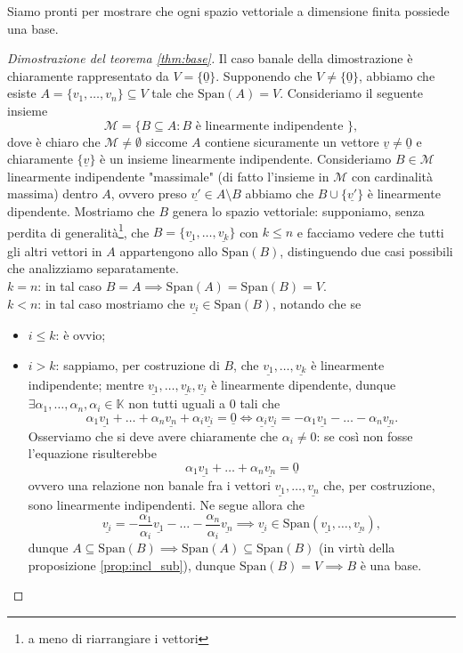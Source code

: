 Siamo pronti per mostrare che ogni spazio vettoriale a dimensione finita possiede una base.
\begin{proof}[Dimostrazione del teorema \ref{thm:base}]
    Il caso banale della dimostrazione è chiaramente rappresentato da $V = \{ \underline{0} \}$. Supponendo che $V \neq \{ \underline{0} \}$, abbiamo che esiste $A = \{ v_1, \ldots, v_n \} \subseteq V$ tale che $\text{Span}(A) = V$. Consideriamo il seguente insieme
    $$
        \mathcal{M} = \{ B \subseteq A : B \text{ è linearmente indipendente }\},
    $$
    dove è chiaro che $\mathcal{M} \neq \emptyset$ siccome $A$ contiene sicuramente un vettore $\underline{v} \neq \underline{0}$ e chiaramente $\{ \underline{v} \}$ è un insieme linearmente indipendente. Consideriamo $B \in \mathcal{M}$ linearmente indipendente "massimale" (di fatto l'insieme in $\mathcal{M}$ con cardinalità massima) dentro $A$, ovvero preso $\underline{v'} \in A \setminus B$ abbiamo che $B \cup \{ \underline{v'} \}$ è linearmente dipendente. Mostriamo che $B$ genera lo spazio vettoriale: supponiamo, senza perdita di generalità\footnote{a meno di riarrangiare i vettori}, che $B = \{ \underline{v_1}, \ldots, \underline{v_k} \}$ con $k \leq n$ e 
    facciamo vedere che tutti gli altri vettori in $A$ appartengono allo $\text{Span}(B)$, distinguendo due casi possibili che analizziamo separatamente. \\
    $\boxed{k = n}$: in tal caso $B = A \implies \text{Span}(A) = \text{Span}(B) = V$. \\
    $\boxed{k < n}$: in tal caso mostriamo che $\underline{v_i} \in \text{Span}(B)$, notando che se
    \begin{itemize}
        \item $i \leq k$: è ovvio;
        \item $i > k$: sappiamo, per costruzione di $B$, che $\underline{v_1}, \ldots, \underline{v_k}$ è linearmente indipendente; mentre $\underline{v_1}, \ldots, \underline{v_k}, \underline{v_i}$ è linearmente dipendente, dunque $\exists \alpha_1, \ldots, \alpha_n, \alpha_i \in \mathbb{K}$ non tutti uguali a $0$ tali che
        $$
            \alpha_1 \underline{v_1} + \ldots + \alpha_n \underline{v_n} + \alpha_i \underline{v_i} = \underline{0} \iff \underline{\alpha_i} \underline{v_i} = - \alpha_1 \underline{v_1} - \ldots - \alpha_n \underline{v_n}.
        $$
        Osserviamo che si deve avere chiaramente che $\alpha_i \neq 0$: se così non fosse l'equazione risulterebbe
        $$
            \alpha_1 \underline{v_1} + \ldots + \alpha_n \underline{v_n} = \underline{0}
        $$
        ovvero una relazione non banale fra i vettori $\underline{v_1}, \ldots, \underline{v_n}$ che, per costruzione, sono linearmente indipendenti. Ne segue allora che
        $$
            \underline{v_i} = - \frac{\alpha_1}{\alpha_i} \underline{v_1} - \ldots - \frac{\alpha_n}{\alpha_i} \underline{v_n} \implies \underline{v_i} \in \text{Span}(\underline{v_1}, \ldots, \underline{v_n}),
        $$
        dunque $A \subseteq \text{Span}(B) \implies \text{Span}(A) \subseteq \text{Span}(B)$ (in virtù della proposizione \ref{prop:incl_sub}), dunque $\text{Span}(B) = V \implies B$ è una base.
    \end{itemize}
\end{proof}
